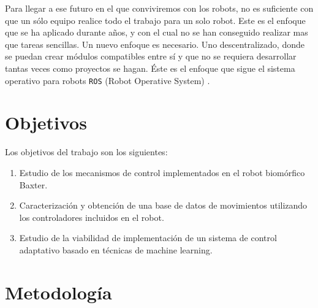 Para llegar a ese futuro en el que conviviremos con los robots, no es suficiente con que un sólo equipo realice todo el trabajo para un solo robot. Este es el enfoque que se ha aplicado durante años, y con el cual no se han conseguido realizar mas que tareas sencillas. Un nuevo enfoque es necesario. Uno descentralizado, donde se puedan crear módulos compatibles entre sí y que no se requiera desarrollar tantas veces como proyectos se hagan. Éste es el enfoque que sigue el sistema operativo para robots \texttt{ROS} (Robot Operative System) \cite{ros}.

\section{Objetivos}
Los objetivos del trabajo son los siguientes:
\begin{enumerate}
	\item Estudio de los mecanismos de control implementados en el robot biomórfico Baxter.
	\item Caracterización y obtención de una base de datos de movimientos utilizando los controladores incluidos en el robot.
	\item Estudio de la viabilidad de implementación de un sistema de control adaptativo basado en técnicas de machine learning.
\end{enumerate}
\section{Metodología}

%
%
%
%
